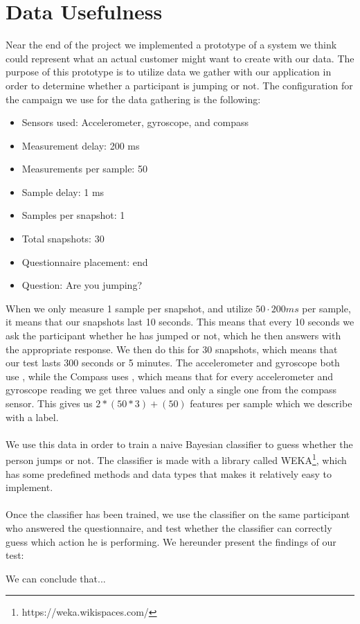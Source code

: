 
\section{Data Usefulness}
\label{sec:data_usefulness}

Near the end of the project we implemented a prototype of a system we think could represent what an actual customer might want to create with our data. The purpose of this prototype is to utilize data we gather with our application in order to determine whether a participant is jumping or not. The configuration for the campaign we use for the data gathering is the following:

\begin{itemize}
    \setlength\itemsep{-0.2em}
    \item Sensors used: Accelerometer, gyroscope, and compass
    \item Measurement delay: 200 ms
    \item Measurements per sample: 50
    \item Sample delay: 1 ms
    \item Samples per snapshot: 1
    \item Total snapshots: 30
    \item Questionnaire placement: end
    \item Question: Are you jumping?
\end{itemize}

When we only measure 1 sample per snapshot, and utilize $50 \cdot 200ms$ per sample, it means that our snapshots last 10 seconds. This means that every 10 seconds we ask the participant whether he has jumped or not, which he then answers with the appropriate response. We then do this for 30 snapshots, which means that our test lasts 300 seconds or 5 minutes. The accelerometer and gyroscope both use , while the Compass uses , which means that for every accelerometer and gyroscope reading we get three values and only a single one from the compass sensor. This gives us $2*(50 * 3) + (50)$ features per sample which we describe with a label.
\\\\
We use this data in order to train a naive Bayesian classifier to guess whether the person jumps or not. The classifier is made with a library called WEKA\footnote{https://weka.wikispaces.com/}, which has some predefined methods and data types that makes it relatively easy to implement.
\\\\
Once the classifier has been trained, we use the classifier on the same participant who answered the questionnaire, and test whether the classifier can correctly guess which action he is performing. We hereunder present the findings of our test:


We can conclude that...

